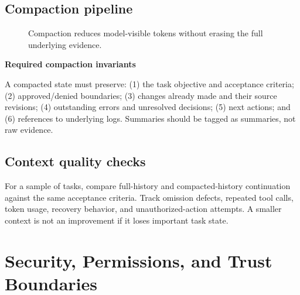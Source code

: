 \documentclass[10pt,letterpaper]{article}
\begin{document}
\subsection{Compaction pipeline}
\begin{figure}[H]
\centering
{}
\caption{Compaction reduces model-visible tokens without erasing the full underlying evidence.}
\end{figure}

\begin{summarybox}
\textbf{Required compaction invariants}\par
A compacted state must preserve: (1) the task objective and acceptance criteria; (2) approved/denied boundaries; (3) changes already made and their source revisions; (4) outstanding errors and unresolved decisions; (5) next actions; and (6) references to underlying logs. Summaries should be tagged as summaries, not raw evidence.
\end{summarybox}

\subsection{Context quality checks}
For a sample of tasks, compare full-history and compacted-history continuation against the same acceptance criteria. Track omission defects, repeated tool calls, token usage, recovery behavior, and unauthorized-action attempts. A smaller context is not an improvement if it loses important task state.

\section{Security, Permissions, and Trust Boundaries}\label{sec:security}
\end{document}
